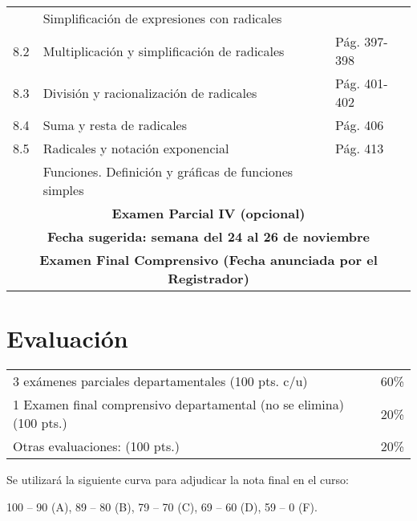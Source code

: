\documentclass{article}
\begin{document}
\begin{longtable}{|p{}|p{}|p{}|}
    \hline
        & Simplificación de expresiones con radicales & \\
    8.2 & Multiplicación y simplificación de radicales & Pág. 397-398 \\
    \hline
    8.3 & División y racionalización de radicales & Pág. 401-402 \\
    \hline
    8.4 & Suma y resta de radicales & Pág. 406 \\
    \hline
    8.5 & Radicales y notación exponencial & Pág. 413 \\
    \hline
     & Funciones. Definición y gráficas de funciones simples & \\
    \hline
    \multicolumn{3}{|c|}{\textbf{Examen Parcial IV (opcional)}} \\
    \multicolumn{3}{|c|}{\textbf{Fecha sugerida: semana del 24 al 26 de noviembre}} \\
    \hline
    \multicolumn{3}{|c|}{\textbf{Examen Final Comprensivo (Fecha anunciada por el Registrador)}} \\
\end{longtable}

\vspace{1cm}
\pagebreak

\section*{Evaluación}
\begin{tabular}{p{}r}
    3 exámenes parciales departamentales (100 pts. c/u) & 60\% \\
    1 Examen final comprensivo departamental (no se elimina) (100 pts.) & 20\% \\
    Otras evaluaciones: (100 pts.) & 20\% \\
\end{tabular}

\vspace{0.5cm}

Se utilizará la siguiente curva para adjudicar la nota final en el curso:
\begin{center}
    100 – 90 (A), 89 – 80 (B), 79 – 70 (C), 69 – 60 (D), 59 – 0 (F).
\end{center}
\end{document}
